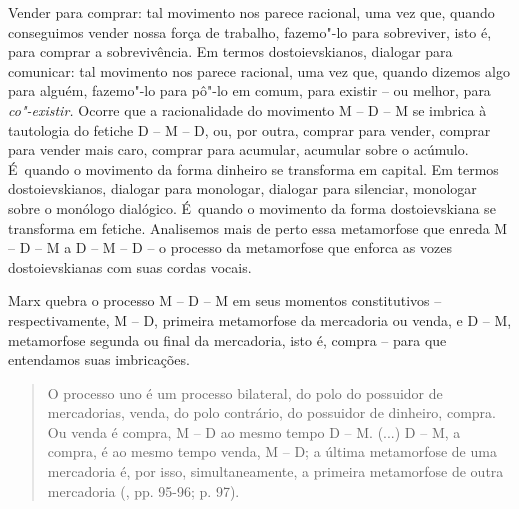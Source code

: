 {Vender para comprar: tal movimento nos parece racional, uma vez que,
quando conseguimos vender nossa força de trabalho, fazemo"-lo para
sobreviver, isto é, para comprar a sobrevivência. Em termos
dostoievskianos, dialogar para comunicar: tal movimento nos parece
racional, uma vez que, quando dizemos algo para alguém, fazemo"-lo para
pô"-lo em comum, para existir -- ou melhor, para \emph{co"-existir.}
Ocorre que a racionalidade do movimento M -- D -- M se imbrica à
tautologia do fetiche D -- M -- D, ou, por outra, comprar para vender,
comprar para vender mais caro, comprar para acumular, acumular sobre o
acúmulo. É~quando o movimento da forma dinheiro se transforma em
capital. Em termos dostoievskianos, dialogar para monologar, dialogar
para silenciar, monologar sobre o monólogo dialógico. É~quando o
movimento da forma dostoievskiana se transforma em fetiche. Analisemos
mais de perto essa metamorfose que enreda M -- D -- M a D -- M -- D -- o
processo da metamorfose que enforca as vozes dostoievskianas com suas
cordas vocais.

Marx quebra o processo M -- D -- M em seus momentos constitutivos --
respectivamente, M -- D, primeira metamorfose da mercadoria ou venda, e
D -- M, metamorfose segunda ou final da mercadoria, isto é, compra --
para que entendamos suas imbricações.

\begin{quote}
O processo uno é um processo bilateral, do polo do possuidor de
mercadorias, venda, do polo contrário, do possuidor de dinheiro, compra.
Ou venda é compra, M -- D ao mesmo tempo D -- M. (...) D -- M, a compra,
é ao mesmo tempo venda, M -- D; a última metamorfose de uma mercadoria
é, por isso, simultaneamente, a primeira metamorfose de outra mercadoria
(, pp. 95-96; p. 97).
\end{quote}

}
